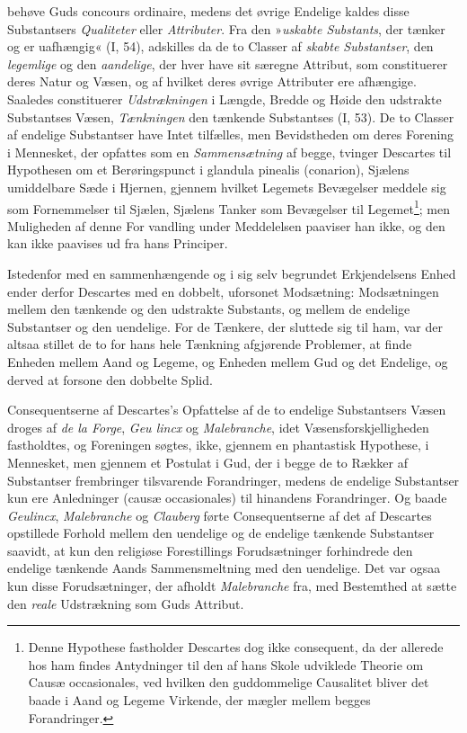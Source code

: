 \documentclass[12pt,a4paper]{book}
\newcommand{\opage}[1]{\marginnote{\footnotesize\textit{[#1]}}}
\begin{document}
behøve Guds concours ordinaire, medens det øvrige Endelige kaldes disse
Substantsers \emph{Qualiteter} eller \emph{Attributer}. Fra den
»\emph{uskabte Substants}, der tænker og er uafhængig« (I, 54), adskilles
da de to Classer af \emph{skabte Substantser}, den \emph{legemlige} og
den \emph{aandelige}, der hver have sit særegne Attribut, som
constituerer deres Natur og Væsen, og af hvilket deres øvrige Attributer
ere afhængige. Saaledes constituerer \emph{Udstrækningen} i Længde,
Bredde og Høide den udstrakte Substantses Væsen, \emph{Tænkningen} den
tænkende Substantses (I, 53). De to Classer af endelige Substantser have
Intet tilfælles, men Bevidstheden om deres Forening i Mennesket, der
opfattes som en \emph{Sammensætning} af begge, tvinger Descartes til
Hypothesen om et Berøringspunct i glandula pinealis (conarion), Sjælens
umiddelbare Sæde i Hjernen, gjennem hvilket Legemets Bevægelser meddele
sig som Fornemmelser til Sjælen, Sjælens Tanker som Bevægelser til
Legemet\footnote{Denne Hypothese fastholder Descartes dog ikke consequent,
da der allerede hos ham findes Antydninger til den af hans Skole udviklede
Theorie om Causæ occasionales, ved hvilken den guddommelige Causalitet
bliver det baade i Aand og Legeme Virkende, der mægler mellem begges
Forandringer.}; men Muligheden af denne For\-%
\opage{21}vandling under Meddelelsen paaviser han ikke, og den kan ikke paavises ud
fra hans Principer.

Istedenfor med en sammenhængende og i sig selv begrundet Erkjendelsens
Enhed ender derfor Descartes med en dobbelt, uforsonet Modsætning:
Modsætningen mellem den tænkende og den udstrakte Substants, og mellem de
endelige Substantser og den uendelige. For de Tænkere, der sluttede sig
til ham, var der altsaa stillet de to for hans hele Tænkning afgjørende
Problemer, at finde Enheden mellem Aand og Legeme, og Enheden mellem Gud
og det Endelige, og derved at forsone den dobbelte Splid.

Consequentserne af Descartes's Opfattelse af de to endelige Substantsers
Væsen droges af \emph{de la Forge}, \emph{Geu\-%
lincx} og \emph{Malebranche}, idet Væsensforskjelligheden fastholdtes, og
Foreningen søgtes, ikke, gjennem en phantastisk Hypothese, i Mennesket,
men gjennem et Postulat i Gud, der i begge de to Rækker af Substantser
frembringer tilsvarende Forandringer, medens de endelige Substantser kun
ere Anledninger (causæ occasionales) til hinandens Forandringer. Og baade
\emph{Geulincx}, \emph{Malebranche} og \emph{Clauberg} førte
Consequentserne af det af Descartes opstillede Forhold mellem den
uendelige og de endelige tænkende Substantser saavidt, at kun den
religiøse Forestillings Forudsætninger forhindrede den endelige tænkende
Aands Sammensmeltning med den uendelige. Det var ogsaa kun disse
Forudsætninger, der afholdt \emph{Malebranche} fra, med Bestemthed at
sætte den \emph{reale} Udstrækning som Guds Attribut.
\end{document}
